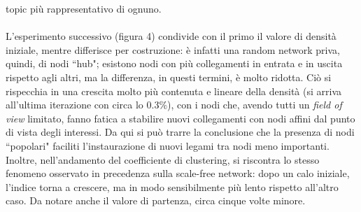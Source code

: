 \documentclass[a4paper,12pt]{article}
\begin{document}
topic più rappresentativo di ognuno.\\ \\
L'esperimento successivo (figura 4) condivide con il primo il valore di densità iniziale, mentre differisce per costruzione: è infatti una random network priva, quindi, di nodi ``hub"; esistono nodi con più collegamenti in entrata e in uscita rispetto agli altri, ma la differenza, in questi termini, è molto ridotta. Ciò si rispecchia in una crescita molto più contenuta e lineare della densità (si arriva all'ultima iterazione con circa lo $0.3\%$), con i nodi che, avendo tutti un \textit{field of view} limitato, fanno fatica a stabilire nuovi collegamenti con nodi affini dal punto di vista degli interessi. Da qui si può trarre la conclusione che la presenza di nodi ``popolari" faciliti l'instaurazione di nuovi legami tra nodi meno importanti.
Inoltre, nell'andamento del coefficiente di clustering, si riscontra lo stesso fenomeno osservato in precedenza sulla scale-free network: dopo un calo iniziale, l'indice torna a crescere, ma in modo sensibilmente più lento rispetto all'altro caso. Da notare anche il valore di partenza, circa cinque volte minore. 
\end{document}
